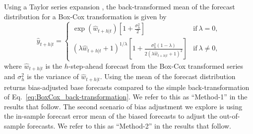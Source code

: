 \documentclass[12pt]{article}
\theoremstyle{definition}
\begin{document}
Using a Taylor series expansion \citep{guerrero1993time}, the back-transformed mean of the forecast distribution for a Box-Cox transformation is given by
\begin{equation}\label{eq:BoxCox_BT_biasadj}
  \hat{y}_{t+h|t} =
    \begin{cases}
      \exp(\hat{w}_{t+h|t})\left[1+\frac{\sigma_h^2}{2}\right] & \text{if}~\lambda = 0, \\
      (\lambda \hat{w}_{t+h|t} + 1)^{1/\lambda}
        \left[1 + \frac{\sigma_h^2(1-\lambda)}{2(\lambda \hat{w}_{t+h|t} + 1)^2}\right]
                                                      & \text{if}~\lambda \ne 0,
\end{cases}
\end{equation}
where $\hat{w}_{t+h|t}$ is the $h$-step-ahead forecast from the Box-Cox transformed series and $\sigma_h^2$ is the variance of $\hat{w}_{t+h|t}$. Using the mean of the forecast distribution returns bias-adjusted base forecasts compared to the simple back-transformation of Eq.~\eqref{eq:BoxCox_back-transformation}. We refer to this as ``Method-1'' in the results that follow. The second scenario of bias adjustment we explore is using the in-sample forecast error mean of the biased forecasts to adjust the out-of-sample forecasts. We refer to this as ``Method-2'' in the results that follow.
\end{document}
